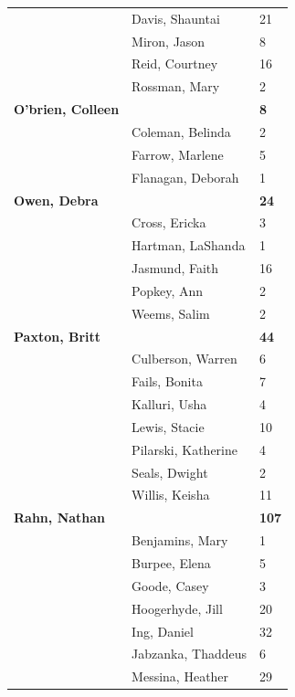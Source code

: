 \documentclass{article}\usepackage[]{graphicx}\usepackage[]{color}
\begin{document}
{\begin{longtable} { >{\raggedright}p{}|p{}p{}}
   & Davis, Shauntai & 21 \\ 
   & Miron, Jason & 8 \\ 
   \rowcolor[gray]{0.90} & Reid, Courtney & 16 \\ 
   \rowcolor[gray]{0.90} & Rossman, Mary & 2 \\ 
   \rowcolor[gray]{0.90}\textbf{O'brien, Colleen} &  & \hspace{2cm}\textbf{8} \\ 
   & Coleman, Belinda & 2 \\ 
   & Farrow, Marlene & 5 \\ 
   & Flanagan, Deborah & 1 \\ 
   \rowcolor[gray]{0.90}\textbf{Owen, Debra} &  & \hspace{2cm}\textbf{24} \\ 
   \rowcolor[gray]{0.90} & Cross, Ericka & 3 \\ 
   \rowcolor[gray]{0.90} & Hartman, LaShanda & 1 \\ 
   & Jasmund, Faith & 16 \\ 
   & Popkey, Ann & 2 \\ 
   & Weems, Salim & 2 \\ 
   \rowcolor[gray]{0.90}\textbf{Paxton, Britt} &  & \hspace{2cm}\textbf{44} \\ 
   \rowcolor[gray]{0.90} & Culberson, Warren & 6 \\ 
   \rowcolor[gray]{0.90} & Fails, Bonita & 7 \\ 
   & Kalluri, Usha & 4 \\ 
   & Lewis, Stacie & 10 \\ 
   & Pilarski, Katherine & 4 \\ 
   \rowcolor[gray]{0.90} & Seals, Dwight & 2 \\ 
   \rowcolor[gray]{0.90} & Willis, Keisha & 11 \\ 
   \rowcolor[gray]{0.90}\textbf{Rahn, Nathan} &  & \hspace{2cm}\textbf{107} \\ 
   & Benjamins, Mary & 1 \\ 
   & Burpee, Elena & 5 \\ 
   & Goode, Casey & 3 \\ 
   \rowcolor[gray]{0.90} & Hoogerhyde, Jill & 20 \\ 
   \rowcolor[gray]{0.90} & Ing, Daniel & 32 \\ 
   \rowcolor[gray]{0.90} & Jabzanka, Thaddeus & 6 \\ 
   & Messina, Heather & 29 \\ 

\end{longtable}}
\end{document}
